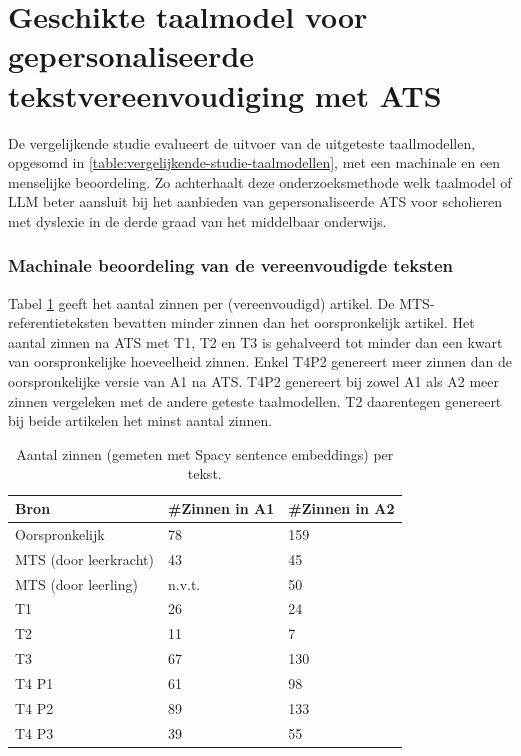 \section{Geschikte taalmodel voor gepersonaliseerde tekstvereenvoudiging met ATS}

De vergelijkende studie evalueert de uitvoer van de uitgeteste taallmodellen, opgesomd in \ref{table:vergelijkende-studie-taalmodellen}, met een machinale en een menselijke beoordeling. Zo achterhaalt deze onderzoeksmethode welk taalmodel of LLM beter aansluit bij het aanbieden van gepersonaliseerde ATS voor scholieren met dyslexie in de derde graad van het middelbaar onderwijs. 

\subsubsection{Machinale beoordeling van de vereenvoudigde teksten}

\medspace

Tabel \ref{table:resultaten-aantal-zinnen} geeft het aantal zinnen per (vereenvoudigd) artikel. De MTS-referentieteksten bevatten minder zinnen dan het oorspronkelijk artikel. Het aantal zinnen na ATS met T1, T2 en T3 is gehalveerd tot minder dan een kwart van oorspronkelijke hoeveelheid zinnen. Enkel T4P2 genereert meer zinnen dan de oorspronkelijke versie van A1 na ATS. T4P2 genereert bij zowel A1 als A2 meer zinnen vergeleken met de andere geteste taalmodellen. T2 daarentegen genereert bij beide artikelen het minst aantal zinnen.

\medspace


\begin{table}[h]
	\centering
	\begin{tabular}{ | m{3cm} | m{3cm} | m{3cm} | } 
		\hline
		\textbf{Bron} & \textbf{#Zinnen in A1} & \textbf{#Zinnen in A2} \\
		\hline
		Oorspronkelijk & 78  & 159 \\ 
		\hline
		MTS (door leerkracht) & 43 & 45 \\
		\hline
		MTS (door leerling) & n.v.t. & 50 \\
		\hline
		T1 & 26 & 24 \\
		\hline
		T2 & 11 & 7 \\
		\hline
		T3 & 67 & 130 \\
		\hline
		T4 P1 & 61 & 98 \\
		\hline
		T4 P2 & 89 & 133 \\
		\hline
		T4 P3 & 39 & 55 \\
		\hline
	\end{tabular}
	\caption{Aantal zinnen (gemeten met Spacy sentence embeddings) per tekst.}
	\label{table:resultaten-aantal-zinnen}
\end{table}

